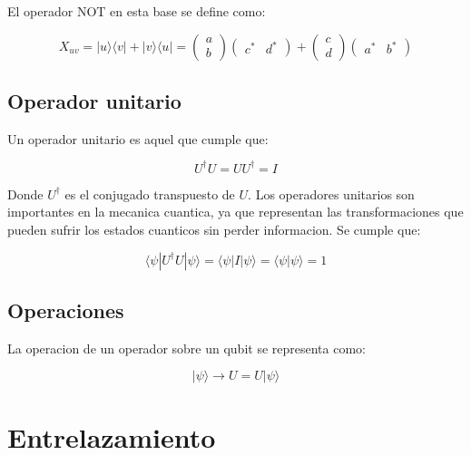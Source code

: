 \documentclass[11pt]{article}
\begin{document}
El operador NOT en esta base se define como:

\begin{equation}
    X_{uv} = |u\rangle \langle v| + |v\rangle \langle u| = \begin{pmatrix} a \\ b \end{pmatrix} \begin{pmatrix} c^* & d^* \end{pmatrix} + \begin{pmatrix} c \\ d \end{pmatrix} \begin{pmatrix} a^* & b^* \end{pmatrix}
\end{equation}

\subsection{Operador unitario}

Un operador unitario es aquel que cumple que:

\begin{equation}
    U^\dagger U = U U^\dagger = I
\end{equation}

Donde $U^\dagger$ es el conjugado transpuesto de $U$. Los operadores unitarios son importantes en la mecanica cuantica, ya que representan las transformaciones que pueden sufrir los estados cuanticos sin perder informacion. Se cumple que:

\begin{equation}
    \langle \psi | U^\dagger U | \psi \rangle = \langle \psi | I | \psi \rangle = \langle \psi | \psi \rangle = 1
\end{equation}

\subsection{Operaciones}

La operacion de un operador sobre un qubit se representa como:

\begin{equation}
    |\psi\rangle \rightarrow U = U |\psi\rangle
\end{equation}

\section{Entrelazamiento}
\end{document}
